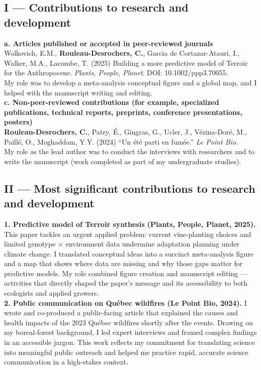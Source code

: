\documentclass[12pt]{article}
\begin{document}
\subsection*{I --- Contributions to research and development}

\textbf{a. Articles published or accepted in peer-reviewed journals} \\[2pt]
Wolkovich, E.M., \textbf{Rouleau-Desrochers, C.}, Garcia de Cortazar-Atauri, I., Walker, M.A., Lacombe, T. (2025) Building a more predictive model of Terroir for the Anthropocene. \textit{Plants, People, Planet}. DOI: 10.1002/ppp3.70055.  \\
My role was to develop a meta-analysis conceptual figure and a global map, and I helped with the manuscript writing and editing. \\[6pt]

\textbf{c. Non-peer-reviewed contributions (for example, specialized publications, technical reports, preprints, conference presentations, posters)} \\[2pt]
\textbf{Rouleau-Desrochers, C.}, Patry, É., Gingras, G., Ucler, J., Vézina-Doré, M., Paillé, O., Moghaddam, Y.Y. (2024) ``Un été parti en fumée.'' \textit{Le Point Bio}.  \\
My role as the lead author was to conduct the interviews with researchers and to write the manuscript (work completed as part of my undergraduate studies). 

\subsection*{II --- Most significant contributions to research and development}

\textbf{1. Predictive model of Terroir synthesis (Plants, People, Planet, 2025).}  
This paper tackles an urgent applied problem: current vine-planting choices and limited genotype × environment data undermine adaptation planning under climate change. I translated conceptual ideas into a succinct meta-analysis figure and a map that shows where data are missing and why those gaps matter for predictive models. My role combined figure creation and manuscript editing — activities that directly shaped the paper's message and its accessibility to both ecologists and applied growers. \\

\textbf{2. Public communication on Québec wildfires (Le Point Bio, 2024).}  
I wrote and co-produced a public-facing article that explained the causes and health impacts of the 2023 Québec wildfires shortly after the events. Drawing on my boreal-forest background, I led expert interviews and framed complex findings in an accessible jargon. This work reflects my commitment for translating science into meaningful public outreach and helped me practice rapid, accurate science communication in a high-stakes context.
\end{document}
